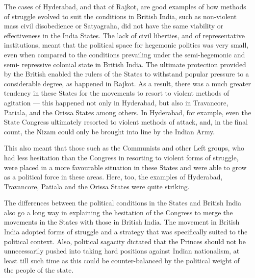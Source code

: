 \begin{multicols}{2}
The cases of Hyderabad, and that of Rajkot, are good examples of how methods of struggle evolved to suit the conditions in British India, such as non-violent mass civil disobedience or Satyagraha, did not have the same viability or effectiveness in the India States. The lack of civil liberties, and of representative institutions, meant that the political space for hegemonic politics was very small, even when compared to the conditions prevailing under the semi-hegemonic and semi- repressive colonial state in British India. The ultimate protection provided by the British enabled the rulers of the States to withstand popular pressure to a considerable degree, as happened in Rajkot. As a result, there was a much greater tendency in these States for the movements to resort to violent methods of agitation --- this happened not only in Hyderabad, but also in Travancore, Patiala, and the Orissa States among others. In Hyderabad, for example, even the State Congress ultimately resorted to violent methods of attack, and, in the final count, the Nizam could only be brought into line by the Indian Army. 

This also meant that those such as the Communists and other Left groups, who had less hesitation than the Congress in resorting to violent forms of struggle, were placed in a more favourable situation in these States and were able to grow as a political force in these areas. Here, too, the examples of Hyderabad, Travancore, Patiala and the Orissa States were quite striking. 

The differences between the political conditions in the States and British India also go a long way in explaining the hesitation of the Congress to merge the movements in the States with those in British India. The movement in British India adopted forms of struggle and a strategy that was specifically suited to the political context. Also, political sagacity dictated that the Princes should not be unnecessarily pushed into taking hard positions against Indian nationalism, at least till such time as this could be counter-balanced by the political weight of the people of the state.
\end{multicols}